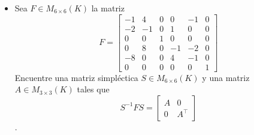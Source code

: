 \documentclass[letter,twoside,12pt]{article}
\begin{document}
\begin{itemize}
\begin{proof}
Ya se ha demostrado que para cualquier base $ S $ si la representación matricial de $ f $ es
$$\Big[f\Big]^S_S=\left[\begin{array}{cc} A_{11} & A_{12}\\ A_{21} & A_{22}\end{array}\right]$$ entonces la representación del adjunto de $ f $, $ g $ es igual a
$$\Big[g\Big]^S_S=\left[\begin{array}{cc} A_{22}^\intercal & -A_{12}^\intercal\\ -A_{21}^\intercal & A_{11}^\intercal\end{array}\right]$$ y por lo tanto si el operador es autoadjunto entonces tenemos que $ A_{11}=A_{22}^\intercal $. Solo nos falta demostrar que existe una base de Darboux tal que $ A_{12} $ y $ A_{21} $ son iguales a 0. Esta base la podemos obtener de la misma manera que se obtiene la forma canónica de Jordan. El resultado es una matriz diagonal con bloques que cumple los requisitos establecidos.
\end{proof}

\item Sea $F\in M_{6\times 6}(K)$ la matriz
$$F=\left[
\begin{array}{rrrrrr}
-1 & 4 & 0 & 0 & -1 & 0\\
-2 & -1 & 0 & 1 & 0 & 0\\
0 & 0 & 1 & 0 & 0 & 0\\
0 & 8 & 0 &-1 & -2 & 0\\
-8 & 0 & 0 & 4 & -1 & 0\\
0 & 0 & 0 & 0 & 0 & 1
\end{array}
\right]$$
Encuentre una matriz simpl\'ectica $S\in M_{6\times 6}(K)$ y una matriz $A\in M_{3\times 3}(K)$ tales que
$$ S^{-1}FS=\left[\begin{array}{cc} A & 0\\ 0 & A^\intercal\end{array}\right]$$.


\end{itemize}
\end{document}
